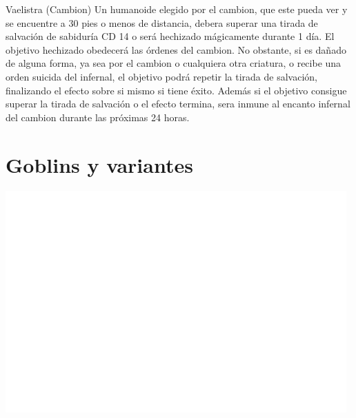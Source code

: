 \documentclass[10pt,twoside,twocolumn,openany]{dndbook}
\begin{document}
\begin{DndMonster}[width=\linewidth]{Vaelistra (Cambion)}
  Un humanoide elegido por el cambion, que este pueda ver y se encuentre a 30 pies o menos de 
  distancia, debera superar una tirada de salvación de sabiduría CD 14 o será hechizado 
  mágicamente durante 1 día. El objetivo hechizado obedecerá las órdenes del cambion. No obstante,
  si es dañado de alguna forma, ya sea por el cambion o cualquiera otra criatura, o recibe una 
  orden suicida del infernal, el objetivo podrá repetir la tirada de salvación, finalizando el 
  efecto sobre si mismo si tiene éxito. Además si el objetivo consigue superar la tirada de 
  salvación o el efecto termina, sera inmune al encanto infernal del cambion durante las próximas
  24 horas.


\end{DndMonster}


\chapter*{Goblins y variantes}


\begin{strip}
  \centering
  \includegraphics[width=\textwidth, height=8.5cm]{media/invisible.png}
\end{strip}
\end{document}
